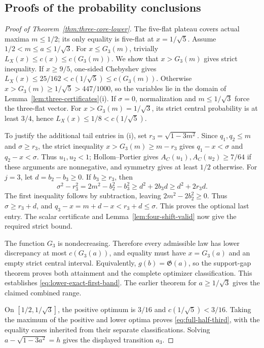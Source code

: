 \documentclass[11pt]{article}
\theoremstyle{remark}\newtheorem{remark}[theorem]{Remark}
\begin{document}
\subsection{Proofs of the probability conclusions}
\begin{proof}[Proof of Theorem~\ref{thm:three-core-lower}]
The five-flat plateau covers actual maxima $m\le1/2$; its only equality
is five-flat at $x=1/\sqrt5$. Assume $1/2<m\le a\le1/\sqrt3$.
For $x\le G_3(m)$, trivially $L_X(x)\le c(x)\le c(G_3(m))$.
We show that $x>G_3(m)$ gives strict inequality.
If $x\ge9/5$, one-sided Chebyshev gives
$L_X(x)\le25/162<c(1/\sqrt5)\le c(G_3(m))$.
Otherwise $x>G_3(m)\ge1/\sqrt5>447/1000$, so the variables lie
in the domain of Lemma~\ref{lem:three-certificates}(i).
If $\sigma=0$, normalization and $m\le1/\sqrt3$ force the
three-flat vector. For $x>G_3(m)=1/\sqrt3$, its strict central
probability is at least $3/4$, hence $L_X(x)\le1/8<c(1/\sqrt5)$.

To justify the additional tail entries in (i), set
$r_3=\sqrt{1-3m^2}$. Since $q_1,q_2\le m$ and $\sigma\ge r_3$,
the strict inequality $x>G_3(m)\ge m-r_3$ gives
$q_1-x<\sigma$ and $q_2-x<\sigma$. Thus $u_1,u_2<1$;
Hollom--Portier gives $A_C(u_1),A_C(u_2)\ge7/64$ if these
arguments are nonnegative, and symmetry gives at least $1/2$ otherwise.
For $j=3$, let $d=b_2-b_3\ge0$. If $b_3\ge r_3$, then
\[
 \sigma^2-r_3^2=2m^2-b_2^2-b_3^2
 \ge d^2+2b_3d\ge d^2+2r_3d.
\]
The first inequality follows by subtraction, leaving
$2m^2-2b_2^2\ge0$. Thus $\sigma\ge r_3+d$, and
$q_3-x=m+d-x<r_3+d\le\sigma$. This proves the optional last
entry. The scalar certificate and Lemma~\ref{lem:four-shift-valid}
now give the required strict bound.

The function $G_3$ is nondecreasing. Therefore every admissible law
has lower discrepancy at most $c(G_3(a))$, and equality must have
$x=G_3(a)$ and an empty strict central interval. Equivalently,
$g(b)=\mathfrak G(a)$, so the support-gap theorem proves both
attainment and the complete optimizer classification. This establishes
\eqref{eq:lower-exact-first-band}. The earlier theorem for
$a\ge1/\sqrt3$ gives the claimed combined range.

On $[1/2,1/\sqrt3]$, the positive optimum is $3/16$ and
$c(1/\sqrt5)<3/16$. Taking the maximum of the positive and lower
optima proves \eqref{eq:full-half-third}, with the equality cases
inherited from their separate classifications. Solving
$a-\sqrt{1-3a^2}=h$ gives the displayed transition $a_3$.
\end{proof}
\end{document}
